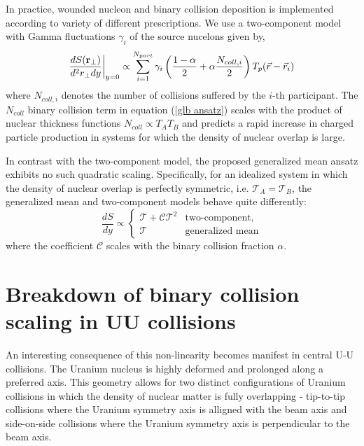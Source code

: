 \documentclass[aps,prl,reprint,amsmath,nofootinbib]{revtex4-1}
\begin{document}
In practice, wounded nucleon and binary collision deposition is implemented according to variety of different prescriptions. We use a two-component model
with Gamma fluctuations $\gamma_i$ of the source nucelons given by,
\begin{equation}
 \label{glb algorithm}
 \frac{dS({\bf r}_\perp)}{d^2r_\perp dy} \biggr \rvert_{y=0}  \propto \sum\limits_{i=1}^{N_{part}} \gamma_i \left(\frac{1-\alpha}{2} + \alpha \frac{N_{coll,i}}{2} \right ) T_p(\vec{r}-\vec{r}_i)
\end{equation}
where $N_{coll,i}$ denotes the number of collisions suffered by the $i$-th participant. The $N_{coll}$ binary collision term in equation (\ref{glb ansatz}) scales with the product of nuclear thickness 
functions $N_{coll} \propto T_A T_B$ and predicts a rapid increase in charged particle production in systems for which the density of nuclear overlap is large.  

In contrast with the two-component model, the proposed generalized mean ansatz exhibits no such quadratic scaling. Specifically, for an idealized system in which the density of nuclear overlap is perfectly symmetric, 
i.e. $\mathcal{T}_A = \mathcal{T}_B$, the generalized mean and two-component models behave quite differently:
\begin{equation}
   \label{symmetric scaling}
   \frac{dS}{dy} \propto
  \begin{cases}
   \mathcal{T} + \mathcal{C} \mathcal{T}^2 & \text{two-component,}\\
   \mathcal{T} & \text{generalized mean}
  \end{cases}
\end{equation}
where the coefficient $\mathcal{C}$ scales with the binary collision fraction $\alpha$.

\section{Breakdown of binary collision scaling in UU collisions}

An interesting consequence of this non-linearity becomes manifest in central U-U collisions. The Uranium nucleus is highly deformed and prolonged along a preferred
axis. This geometry allows for two distinct configurations of Uranium collisions in which the density of nuclear matter is fully overlapping - tip-to-tip collisions
where the Uranium symmetry axis is alligned with the beam axis and side-on-side collisions where the Uranium symmetry axis is perpendicular to the beam axis.
\end{document}
